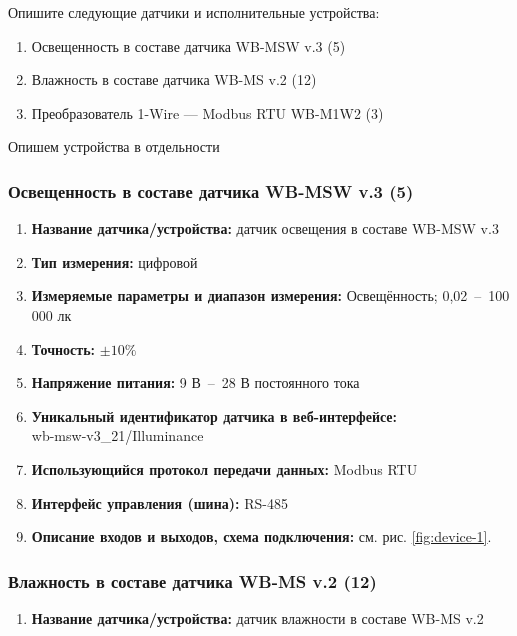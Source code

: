 \documentclass[a4paper,14pt]{extarticle}
\begin{document}
\begin{problem}
	Опишите следующие датчики и исполнительные устройства:
	
	\begin{enumerate}
		\item Освещенность в составе датчика WB-MSW v.3 (5)
		\item Влажность в составе датчика WB-MS v.2 (12)
		\item Преобразователь 1-Wire — Modbus RTU WB-M1W2 (3)
	\end{enumerate}
	\nonum
	Опишем устройства в отдельности
	\subsubsection*{Освещенность в составе датчика WB-MSW v.3 (5)}
	
	\begin{enumerate}
		\item \textbf{Название датчика/устройства:} датчик освещения в составе WB-MSW v.3
		
		\item \textbf{Тип измерения:} цифровой
		
		\item  \textbf{Измеряемые параметры и диапазон измерения:} Освещённость; 0,02~--~100 000 лк
		
		\item  \textbf{Точность:} $\pm10 \%$	
		\item  \textbf{Напряжение питания:} 9 В~--~28 В постоянного тока
		
		\item  \textbf{Уникальный идентификатор датчика в веб-интерфейсе:} \\wb-msw-v3\_21/Illuminance
		
		\item  \textbf{Использующийся протокол передачи данных:} Modbus RTU
		
		\item  \textbf{Интерфейс управления (шина):} RS-485
		
		\item  \textbf{Описание входов и выходов, схема подключения:} см. рис. \ref{fig:device-1}.
	\end{enumerate}
	
	
	\subsubsection*{Влажность в составе датчика WB-MS v.2 (12)}
	\begin{enumerate}
		\item \textbf{Название датчика/устройства:} датчик влажности в составе WB-MS v.2
		

\end{enumerate}
\end{problem}
\end{document}
